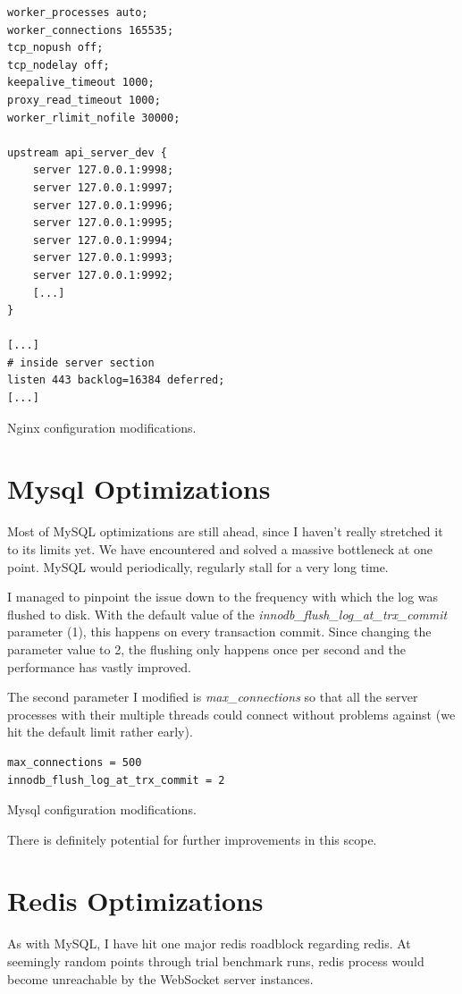 \documentclass{uvamscse}
\begin{document}
\begin{sourcecode}[h]
\begin{lstlisting}[style=mono]
worker_processes auto;
worker_connections 165535;
tcp_nopush off;
tcp_nodelay off;
keepalive_timeout 1000;
proxy_read_timeout 1000;
worker_rlimit_nofile 30000;

upstream api_server_dev {
    server 127.0.0.1:9998;
    server 127.0.0.1:9997;
    server 127.0.0.1:9996;
    server 127.0.0.1:9995;
    server 127.0.0.1:9994;
    server 127.0.0.1:9993;
    server 127.0.0.1:9992;
    [...]
}

[...]
# inside server section
listen 443 backlog=16384 deferred;
[...]
\end{lstlisting}
\caption{Nginx configuration modifications.}
\label{lstlisting:nginx}
\end{sourcecode}

\section{Mysql Optimizations}
Most of MySQL optimizations are still ahead, since I haven't really stretched it to its limits yet. We have encountered and solved a massive bottleneck at one point. MySQL would periodically, regularly stall for a very long time.

I managed to pinpoint the issue down to the frequency with which the log was flushed to disk. With the default value of the \textit{innodb\_flush\_log\_at\_trx\_commit} parameter (1), this happens on every transaction commit. Since changing the parameter value to 2, the flushing only happens once per second and the performance has vastly improved.

The second parameter I modified is \textit{max\_connections} so that all the server processes with their multiple threads could connect without problems against (we hit the default limit rather early).

\begin{sourcecode}[h]
\begin{lstlisting}[style=mono]
max_connections = 500
innodb_flush_log_at_trx_commit = 2
\end{lstlisting}
\caption{Mysql configuration modifications.}
\label{lstlisting:MySQL}
\end{sourcecode}

There is definitely potential for further improvements in this scope.

\section{Redis Optimizations}
As with MySQL, I have hit one major redis roadblock regarding redis. At seemingly random points through trial benchmark runs, redis process would become unreachable by the WebSocket server instances.
\end{document}
